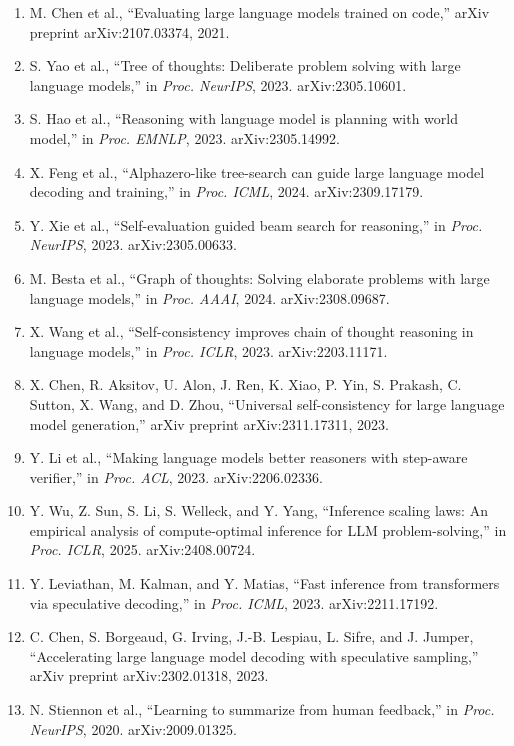 \documentclass[10pt]{article}
\begin{document}
\begin{enumerate}
\item[{[13]}] M. Chen et al., ``Evaluating large language models trained on code,'' arXiv preprint arXiv:2107.03374, 2021.
\item[{[14]}] S. Yao et al., ``Tree of thoughts: Deliberate problem solving with large language models,'' in \emph{Proc. NeurIPS}, 2023. arXiv:2305.10601.
\item[{[15]}] S. Hao et al., ``Reasoning with language model is planning with world model,'' in \emph{Proc. EMNLP}, 2023. arXiv:2305.14992.
\item[{[16]}] X. Feng et al., ``Alphazero-like tree-search can guide large language model decoding and training,'' in \emph{Proc. ICML}, 2024. arXiv:2309.17179.
\item[{[17]}] Y. Xie et al., ``Self-evaluation guided beam search for reasoning,'' in \emph{Proc. NeurIPS}, 2023. arXiv:2305.00633.
\item[{[18]}] M. Besta et al., ``Graph of thoughts: Solving elaborate problems with large language models,'' in \emph{Proc. AAAI}, 2024. arXiv:2308.09687.
\item[{[19]}] X. Wang et al., ``Self-consistency improves chain of thought reasoning in language models,'' in \emph{Proc. ICLR}, 2023. arXiv:2203.11171.
\item[{[20]}] X. Chen, R. Aksitov, U. Alon, J. Ren, K. Xiao, P. Yin, S. Prakash, C. Sutton, X. Wang, and D. Zhou, ``Universal self-consistency for large language model generation,'' arXiv preprint arXiv:2311.17311, 2023.
\item[{[21]}] Y. Li et al., ``Making language models better reasoners with step-aware verifier,'' in \emph{Proc. ACL}, 2023. arXiv:2206.02336.
\item[{[22]}] Y. Wu, Z. Sun, S. Li, S. Welleck, and Y. Yang, ``Inference scaling laws: An empirical analysis of compute-optimal inference for LLM problem-solving,'' in \emph{Proc. ICLR}, 2025. arXiv:2408.00724.
\item[{[23]}] Y. Leviathan, M. Kalman, and Y. Matias, ``Fast inference from transformers via speculative decoding,'' in \emph{Proc. ICML}, 2023. arXiv:2211.17192.
\item[{[24]}] C. Chen, S. Borgeaud, G. Irving, J.-B. Lespiau, L. Sifre, and J. Jumper, ``Accelerating large language model decoding with speculative sampling,'' arXiv preprint arXiv:2302.01318, 2023.
\item[{[25]}] N. Stiennon et al., ``Learning to summarize from human feedback,'' in \emph{Proc. NeurIPS}, 2020. arXiv:2009.01325.

\end{enumerate}
\end{document}
